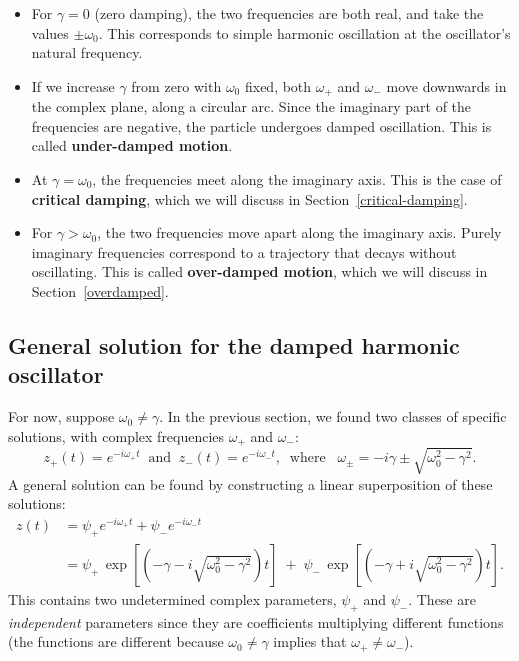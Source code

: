 \documentclass[10pt,a4paper]{article}
\begin{document}
\begin{itemize}
\item
  For $\gamma = 0$ (zero damping), the two frequencies are both real,
  and take the values $\pm \omega_0$. This corresponds to simple
  harmonic oscillation at the oscillator's natural frequency.
\item
  If we increase $\gamma$ from zero with $\omega_0$ fixed, both
  $\omega_+$ and $\omega_-$ move downwards in the complex plane,
  along a circular arc. Since the imaginary part of the frequencies are
  negative, the particle undergoes damped oscillation. This is called
  \textbf{under-damped motion}.
\item
  At $\gamma = \omega_0$, the frequencies meet along the imaginary
  axis. This is the case of \textbf{critical damping}, which we will
  discuss in Section~\ref{critical-damping}.
\item
  For $\gamma > \omega_0$, the two frequencies move apart along the
  imaginary axis. Purely imaginary frequencies correspond to a
  trajectory that decays without oscillating. This is called
  \textbf{over-damped motion}, which we will discuss in
  Section~\ref{overdamped}.
\end{itemize}

\subsection{General solution for the damped harmonic oscillator}
\label{general-solution}

For now, suppose $\omega_0 \ne \gamma$. In the previous section, we
found two classes of specific solutions, with complex frequencies
$\omega_+$ and $\omega_-$:
\begin{equation}
  z_+(t) = e^{-i\omega_+ t} \;\;\mathrm{and}\;\;
  z_-(t) = e^{-i\omega_- t}, \;\;\mathrm{where} \;\;\;
  \omega_\pm = -i\gamma \pm \sqrt{\omega_0^2 - \gamma^2}.
\end{equation}
A general solution can be found by constructing a linear superposition
of these solutions:
\begin{align}
  z(t) &= \psi_+ e^{-i\omega_+ t} + \psi_- e^{-i\omega_- t} \\
  &= \psi_+ \, \exp\left[\left(-\gamma
    - i \sqrt{\omega_0^2 - \gamma^2}\right)t\right] \; +\; \psi_- \,
  \exp\left[\left(-\gamma +i\sqrt{\omega_0^2 - \gamma^2}\right)t\right].
  \label{gensol}
\end{align}
This contains two undetermined complex parameters, $\psi_+$ and
$\psi_-$. These are \emph{independent} parameters since they are
coefficients multiplying different functions (the functions are
different because $\omega_0 \ne \gamma$ implies that $\omega_+ \ne
\omega_-$).
\end{document}
